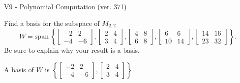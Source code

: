 \begin{exercise}
  \begin{exerciseTitle}V9 - Polynomial Computation (ver. 371)\end{exerciseTitle}
  \begin{exerciseStatement}
    Find a basis for the subspace of \(M_{2,2}\) 
\[W=\mathrm{span}\ \left\{\left[\begin{array}{cc}
-2 & 2 \\
-4 & -6
\end{array}\right] , \left[\begin{array}{cc}
2 & 4 \\
3 & 4
\end{array}\right] , \left[\begin{array}{cc}
4 & 8 \\
6 & 8
\end{array}\right] , \left[\begin{array}{cc}
6 & 6 \\
10 & 14
\end{array}\right] , \left[\begin{array}{cc}
14 & 16 \\
23 & 32
\end{array}\right]\right\}.\]
 Be sure to explain why your result is a basis.


  \end{exerciseStatement}
  \begin{exerciseAnswer}
   A basis of \(W\) is  \(\left\{\left[\begin{array}{cc}
-2 & 2 \\
-4 & -6
\end{array}\right] , \left[\begin{array}{cc}
2 & 4 \\
3 & 4
\end{array}\right]\right\}\).
  


  \end{exerciseAnswer}
\end{exercise}